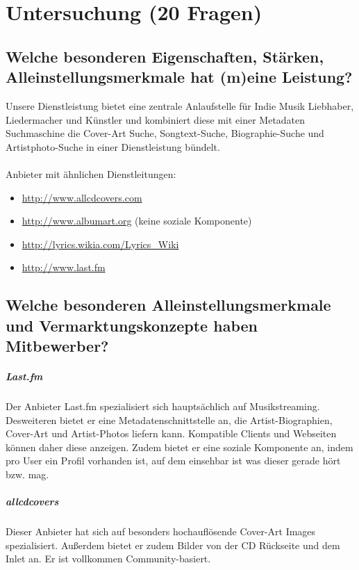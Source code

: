 \chapter{Untersuchung (20 Fragen)}

\label{wettbewerb}
\section{Welche besonderen Eigenschaften, Stärken, Alleinstellungsmerkmale hat (m)eine Leistung?}
Unsere Dienstleistung bietet eine zentrale Anlaufstelle für Indie Musik
Liebhaber, Liedermacher und Künstler und kombiniert diese mit einer Metadaten Suchmaschine
die Cover-Art Suche, Songtext-Suche, Biographie-Suche und Artistphoto-Suche in
einer Dienstleistung bündelt.
\\
\\
Anbieter mit ähnlichen Dienstleitungen: \\

\begin{itemize}
    \item \url{http://www.allcdcovers.com}
    \item \url{http://www.albumart.org} (keine soziale Komponente)
    \item \url{http://lyrics.wikia.com/Lyrics\_Wiki}
    \item \url{http://www.last.fm}
\end{itemize}

\section{Welche besonderen Alleinstellungsmerkmale und Vermarktungskonzepte haben Mitbewerber?}
\paragraph{Last.fm}
Der Anbieter Last.fm spezialisiert sich hauptsächlich auf Musikstreaming.
Desweiteren bietet er eine Metadatenschnittstelle an, die Artist-Biographien,
Cover-Art und Artist-Photos liefern kann. Kompatible Clients und Webseiten können
daher diese anzeigen. Zudem bietet er eine soziale Komponente an, indem pro User
ein Profil vorhanden ist, auf dem einsehbar ist was dieser gerade hört bzw. mag.

\paragraph{allcdcovers}
Dieser Anbieter hat sich auf besonders hochauflösende Cover-Art Images
spezialisiert. Außerdem bietet er zudem Bilder von der CD Rückseite und dem
Inlet an. Er ist vollkommen Community-basiert.

